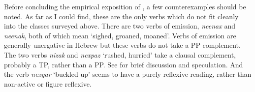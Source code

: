\begin{exe}
\begin{xlist}
\begin{xlist}
\begin{exe}
\begin{xlist}
\begin{xlist}
\begin{exe}
\begin{xlist}
\begin{xlist}
\begin{exe}
\begin{exe}
\begin{xlist}
\begin{exe}
\begin{exe}
\begin{xlist}
\begin{exe}
\begin{exe}
\begin{exe}
\begin{exe}
\begin{exe}
\begin{xlist}
\begin{exe}
\begin{xlist}
\begin{exe}
\begin{exe}
\begin{xlist}
\begin{table}
	\caption{Readings for verbs in {\tnif}\label{tab:3-2:tnif}}
\end{table}

Before concluding the empirical exposition of {\tnif}, a few counterexamples should be noted. As far as I could find, these are the only verbs which do not fit cleanly into the classes surveyed above. There are two verbs of emission, \emph{neenax} and \emph{neenak}, both of which mean `sighed, groaned, moaned'. Verbs of emission are generally unergative in Hebrew \citep{siloni12,gafter14li} but these verbs do not take a PP complement. The two verbs \emph{nizak} and \emph{nexpaz} `rushed, hurried' take a clausal complement, probably a TP, rather than a PP. See \citet[126]{kastner16phd} for brief discussion and speculation. And the verb \emph{nexgar} `buckled up' seems to have a purely reflexive reading, rather than non-active or figure reflexive.


\end{xlist}
\end{exe}
\end{exe}
\end{xlist}
\end{exe}
\end{xlist}
\end{exe}
\end{exe}
\end{exe}
\end{exe}
\end{exe}
\end{xlist}
\end{exe}
\end{exe}
\end{xlist}
\end{exe}
\end{exe}
\end{xlist}
\end{xlist}
\end{exe}
\end{xlist}
\end{xlist}
\end{exe}
\end{xlist}
\end{xlist}
\end{exe}
